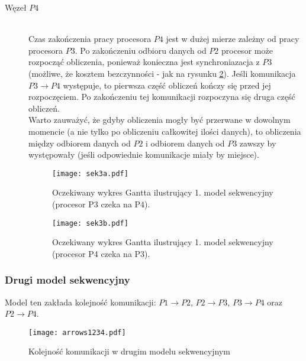 \begin{description}
\item[Węzeł $P4$] \hfill \\

Czas zakończenia pracy procesora $P4$ jest w dużej mierze zależny od pracy procesora $P3$. Po zakończeniu odbioru danych od $P2$ procesor może rozpocząć obliczenia,
ponieważ konieczna jest synchroniazacja z $P3$ (możliwe, że kosztem bezczynności - jak na rysunku \ref{fig:seq1b}).
Jeśli komunikacja $P3 \to P4$ występuje, to pierwsza część obliczeń kończy się przed jej rozpoczęciem. Po zakończeniu tej komunikacji rozpoczyna się druga część obliczeń. \\

Warto zauważyć, że gdyby obliczenia mogły być przerwane w dowolnym momencie (a nie tylko po obliczeniu całkowitej ilości danych),
to obliczenia między odbiorem danych od $P2$ i odbiorem danych od $P3$ zawszy by występowały (jeśli odpowiednie komunikacje miały by miejsce).

\begin{figure}[!ht]
\centering
\texttt{[image: sek3a.pdf]}
\caption{Oczekiwany wykres Gantta ilustrujący 1. model sekwencyjny (procesor P3 czeka na P4).}
\label{fig:seq1a}
\end{figure}

\begin{figure}[!ht]
\centering
\texttt{[image: sek3b.pdf]}
\caption{Oczekiwany wykres Gantta ilustrujący 1. model sekwencyjny (procesor P4 czeka na P3).}
\label{fig:seq1b}
\end{figure}

\end{description}

\subsubsection{Drugi model sekwencyjny}

Model ten zakłada kolejność komunikacji: $P1 \to P2$, $P2 \to P3$, $P3 \to P4$ oraz $P2 \to P4$. \\

\begin{figure}[!ht]
\centering
\texttt{[image: arrows1234.pdf]}
\caption{Kolejność komunikacji w drugim modelu sekwencyjnym}
\label{fig:seq2}
\end{figure}

